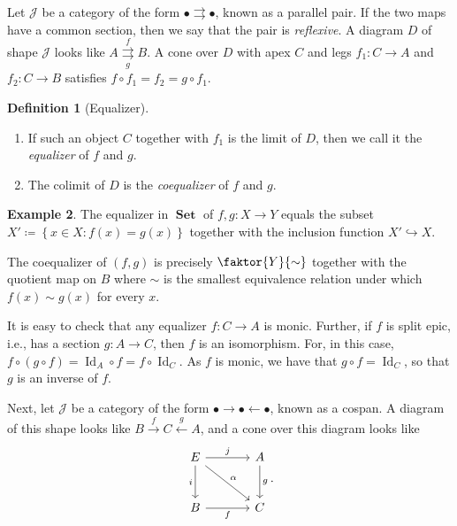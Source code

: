 \documentclass[10pt,letterpaper,cm]{nupset}
\theoremstyle{definition}
\newtheorem{definition}{Definition}[section]
\newtheorem{exmp}[definition]{Example}
\theoremstyle{theorem}
\theoremstyle{remark}
\newcommand{\1}{\mathbf{1}}
\renewcommand{\j}{\mathscr{J}}
\newcommand{\0}{\vec 0}
\DeclareMathOperator{\id}{Id}
\DeclareMathOperator{\set}{\mathbf{Set}}
\begin{document}
\medskip

Let $\j$ be a category of the form $\bullet \rightrightarrows \bullet$, known as a parallel pair. If the two maps have a common section, then we say that the pair is \textit{reflexive}. A diagram $D$ of shape $\j$ looks like $A \overset{f}{\underset{g}{\rightrightarrows}} B$. A cone over $D$ with apex $C$ and legs $f_1 : C \to A$ and $f_2 : C \to B$ satisfies $f\circ f_1=f_2 = g\circ f_1$.

\begin{definition}[Equalizer] $ $
\begin{enumerate}
\item If such an object $C$ together with $f_1$ is the limit of $D$, then we call it the \textit{equalizer} of $f$ and $g$. 
\item The colimit of $D$ is  the \textit{coequalizer} of $f$ and $g$.
\end{enumerate}
\end{definition}

\begin{exmp}\label{set}
The equalizer in $\set$ of $f, g: X \to Y$ equals the subset $X'\coloneqq \left\{x \in X : f(x) = g(x)\right\}$ together with the inclusion function $X' \hookrightarrow X$. 

The coequalizer of $\left(f, g\right)$ is precisely $\faktor{Y}{\sim}$ together with the quotient map on $B$ where $\sim$ is the smallest equivalence relation under which $f(x) \sim g(x)$ for every $x$.
\end{exmp}

\smallskip

It is easy to check that any equalizer $f: C \to A$ is monic. Further, if $f$ is split epic, i.e., has a section $g: A \to C$, then $f$ is an isomorphism. For, in this case, $f\circ \left(g \circ f\right) = \id_A \circ f = f \circ \id_C$. As $f$ is monic, we have that $g \circ f= \id_C$, so that $g$ is an inverse of $f$.



\medskip

Next, let $\j$ be a category of the form $\bullet \rightarrow \bullet \leftarrow \bullet$, known as a cospan. A diagram of this shape looks like $B \overset{f}{\longrightarrow} C \overset{g}{\longleftarrow} A$, and a cone over this diagram looks like 
\[
\begin{tikzcd}[row sep=large, column sep=large]
E \arrow[to=Z, "i ", swap] \arrow[to=2-2, dr, "\alpha"', swap]
& A \arrow[to=2-2, "g "] \\
|[alias=Z]| B  \arrow[to=2-2, "f"'] 
& C
\arrow[from=ul, to=1-2, "j "]
\end{tikzcd}.
\]
\end{document}

